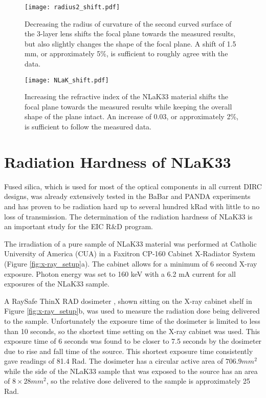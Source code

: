 \begin{figure}[!htb]
	\centering
	\texttt{[image: radius2\_shift.pdf]}
	\caption{Decreasing the radius of curvature of the second curved surface of the 3-layer lens shifts the focal plane towards the measured results, but also slightly changes the shape of the focal plane. A shift of 1.5 mm, or approximately 5\%, is sufficient to roughly agree with the data.}
	\label{fig:radius2_shift}
\end{figure}

\begin{figure}[!htb]
	\centering
	\texttt{[image: NLaK\_shift.pdf]}
	\caption{Increasing the refractive index of the NLaK33 material shifts the focal plane towards the measured results while keeping the overall shape of the plane intact. An increase of 0.03, or approximately 2\%, is sufficient to follow the measured data.}
	\label{fig:NLaK_shift}
\end{figure}

\section{Radiation Hardness of NLaK33}
Fused silica, which is used for most of the optical components in all current DIRC designs, was already extensively tested in the BaBar and PANDA experiments \cite{RadHardness} and has proven to be radiation hard up to several hundred kRad with little to no loss of transmission. The determination of the radiation hardness of NLaK33 is an important study for the EIC R\&D program. 

The irradiation of a pure sample of NLaK33 material was performed at Catholic University of America (CUA) in a Faxitron CP-160 Cabinet X-Radiator System \cite{XRayCabinet} (Figure \ref{fig:x-ray_setup}a). The cabinet allows for a minimum of 6 second X-ray exposure. Photon energy was set to 160 keV with a 6.2 mA current for all exposures of the NLaK33 sample.

A RaySafe ThinX RAD dosimeter \cite{Dosimeter}, shown sitting on the X-ray cabinet shelf in Figure \ref{fig:x-ray_setup}b, was used to measure the radiation dose being delivered to the sample. Unfortunately the exposure time of the dosimeter is limited to less than 10 seconds, so the shortest time setting on the X-ray cabinet was used. This exposure time of 6 seconds was found to be closer to 7.5 seconds by the dosimeter due to rise and fall time of the source. This shortest exposure time consistently gave readings of 81.4 Rad. The dosimeter has a circular active area of $706.9\unit{mm}^2$ while the side of the NLaK33 sample that was exposed to the source has an area of $8\times28\unit{mm}^2$, so the relative dose delivered to the sample is approximately 25 Rad.

